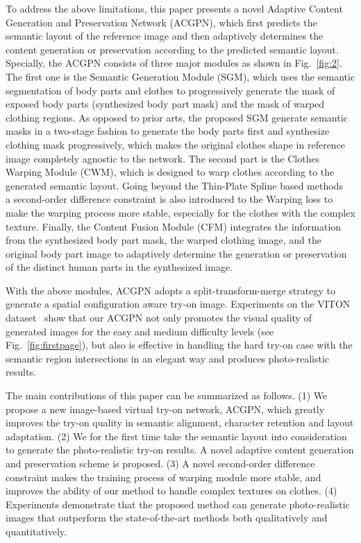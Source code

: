 \documentclass[10pt,twocolumn,letterpaper]{article}
\begin{document}
To address the above limitations, this paper presents a novel Adaptive Content Generation and Preservation Network (ACGPN),
which first predicts the semantic layout of the reference image and then adaptively determines the content generation or preservation according to the predicted semantic layout.
Specially, the ACGPN consists of three major modules as shown in Fig.~\ref{fig:2}.
The first one is the Semantic Generation Module (SGM), which uses the semantic segmentation of body parts and clothes to progressively generate the mask of exposed body parts (\ie synthesized body part mask) and the mask of warped clothing regions.
As opposed to prior arts, the proposed SGM generate semantic masks in a two-stage fashion to generate the body parts first and synthesize clothing mask progressively, which makes the original clothes shape in reference image completely agnostic to the network.
The second part is the Clothes Warping Module (CWM), which is designed to warp clothes according to the generated semantic layout.
Going beyond the Thin-Plate Spline based methods~\cite{DBLP:conf/cvpr/HanWWYD18,DBLP:conf/eccv/WangZLCLY18,DBLP:journals/corr/abs-1902-11026}
a second-order difference constraint is also introduced to the Warping loss to make the warping process more stable,
especially for the clothes with the complex texture.
Finally, the Content Fusion Module (CFM) integrates the information from the synthesized body part mask, the warped clothing  image, and the original body part image to adaptively determine the generation or preservation of the distinct human parts in the synthesized image.


With the above modules, ACGPN adopts a split-transform-merge strategy to generate a spatial configuration aware try-on image.
Experiments on the VITON dataset~\cite{DBLP:conf/eccv/WangZLCLY18} show that our ACGPN not only promotes the visual quality of generated images for the easy and medium difficulty levels (see  Fig.~\ref{fig:firstpage}),
but also is effective in handling the hard try-on case with the semantic region intersections in an elegant way and produces photo-realistic results.






The main contributions of this paper can be summarized as follows.
(1) We propose a new image-based virtual try-on network, \ie ACGPN, which greatly improves the try-on quality in semantic alignment, character retention and layout adaptation.
(2) We for the first time take the semantic layout into consideration to generate the photo-realistic try-on results. A novel adaptive content generation and preservation scheme is proposed.
(3) A novel second-order difference constraint makes the training process of warping module more stable, and improves the ability of our method to handle complex textures on clothes.
(4) Experiments demonstrate that the proposed method can generate photo-realistic images that outperform the state-of-the-art methods both qualitatively and quantitatively.
\end{document}
